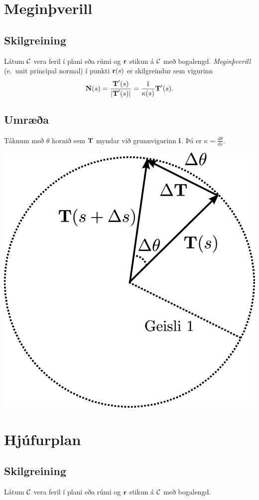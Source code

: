 \documentclass[a4paper,10pt,icelandic]{sphinxmanual}
\begin{document}
\section{Meginþverill}
\label{Kafli1:meginverill}

\subsection{Skilgreining}
\label{Kafli1:id16}\label{Kafli1:index-15}
Látum \(\cal C\) vera feril í plani eða rúmi og
\(\mbox{${\bf r}$}\) stikun á \(\cal C\) með bogalengd.
\emph{Meginþverill} (e. unit principal normal) í punkti
\(\mbox{${\bf r}$}(s)\) er skilgreindur sem vigurinn
\begin{gather}
\begin{split}\displaystyle \mbox{${\bf N}$}(s)=\frac{\mbox{${\bf T}$}'(s)}{|\mbox{${\bf T}$}'(s)|}=\frac{1}{\kappa(s)}\mbox{${\bf T}$}'(s).\end{split}\notag
\end{gather}

\subsection{Umræða}
\label{Kafli1:umraea}
Táknum með \(\theta\) hornið sem \(\mbox{${\bf T}$}\) myndar við
grunnvigurinn \(\mbox{${\bf i}$}\). Þá er
\(\kappa = \frac{d\theta}{ds}\).

{\hfill\includegraphics[width=0.400\linewidth]{krappi.png}\hfill}


\section{Hjúfurplan}
\label{Kafli1:hjufurplan}

\subsection{Skilgreining}
\label{Kafli1:index-16}\label{Kafli1:id17}
Látum \(\cal C\) vera feril í plani eða rúmi og
\(\mbox{${\bf r}$}\) stikun á \(\cal C\) með bogalengd.
\end{document}
